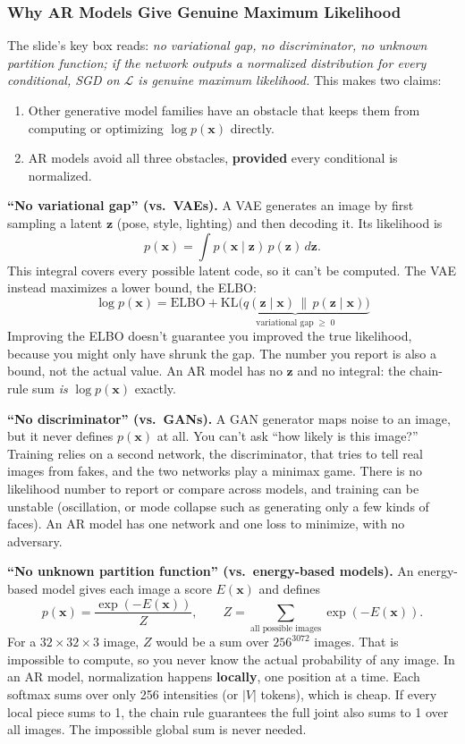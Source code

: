 \subsubsection*{Why AR Models Give Genuine Maximum Likelihood}

The slide's key box reads: \textit{no variational gap, no discriminator, no unknown partition function; if the network outputs a normalized distribution for every conditional, SGD on $\mathcal{L}$ is genuine maximum likelihood.} This makes two claims:
\begin{enumerate}
  \item Other generative model families have an obstacle that keeps them from computing or optimizing $\log p(\mathbf{x})$ directly.
  \item AR models avoid all three obstacles, \textbf{provided} every conditional is normalized.
\end{enumerate}

\textbf{``No variational gap'' (vs.\ VAEs).} A VAE generates an image by first sampling a latent $\mathbf{z}$ (pose, style, lighting) and then decoding it. Its likelihood is
$$p(\mathbf{x}) = \int p(\mathbf{x} \mid \mathbf{z})\, p(\mathbf{z})\, d\mathbf{z}.$$
This integral covers every possible latent code, so it can't be computed. The VAE instead maximizes a lower bound, the ELBO:
$$\log p(\mathbf{x}) = \text{ELBO} + \underbrace{\mathrm{KL}\big(q(\mathbf{z}\mid\mathbf{x}) \,\|\, p(\mathbf{z}\mid\mathbf{x})\big)}_{\text{variational gap} \;\ge\; 0}$$
Improving the ELBO doesn't guarantee you improved the true likelihood, because you might only have shrunk the gap. The number you report is also a bound, not the actual value. An AR model has no $\mathbf{z}$ and no integral: the chain-rule sum \textit{is} $\log p(\mathbf{x})$ exactly.

\textbf{``No discriminator'' (vs.\ GANs).} A GAN generator maps noise to an image, but it never defines $p(\mathbf{x})$ at all. You can't ask ``how likely is this image?'' Training relies on a second network, the discriminator, that tries to tell real images from fakes, and the two networks play a minimax game. There is no likelihood number to report or compare across models, and training can be unstable (oscillation, or mode collapse such as generating only a few kinds of faces). An AR model has one network and one loss to minimize, with no adversary.

\textbf{``No unknown partition function'' (vs.\ energy-based models).} An energy-based model gives each image a score $E(\mathbf{x})$ and defines
$$p(\mathbf{x}) = \frac{\exp(-E(\mathbf{x}))}{Z}, \qquad Z = \sum_{\text{all possible images}} \exp(-E(\mathbf{x})).$$
For a $32\times32\times3$ image, $Z$ would be a sum over $256^{3072}$ images. That is impossible to compute, so you never know the actual probability of any image. In an AR model, normalization happens \textbf{locally}, one position at a time. Each softmax sums over only 256 intensities (or $|V|$ tokens), which is cheap. If every local piece sums to 1, the chain rule guarantees the full joint also sums to 1 over all images. The impossible global sum is never needed.


